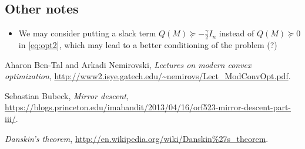 \documentclass{article}
\begin{document}
\subsection*{Other notes}

\begin{itemize}
\item We may consider putting a slack term $Q(M) \succeq -\frac{\gamma}{2} I_n$ instead of $Q(M) \succeq 0$ in \eqref{eq:opt2}, which may lead to a better conditioning of the problem (?)
\end{itemize}


 
\begin{thebibliography}{9}

  Aharon Ben-Tal and Arkadi Nemirovski,
  \emph{Lectures on modern convex optimization},
  \url{http://www2.isye.gatech.edu/~nemirovs/Lect_ModConvOpt.pdf}.
  
  Sebastian Bubeck,
  \emph{Mirror descent},
  \url{https://blogs.princeton.edu/imabandit/2013/04/16/orf523-mirror-descent-part-iii/}.  

  \emph{Danskin's theorem},
  \url{http://en.wikipedia.org/wiki/Danskin\%27s_theorem}.  

\end{thebibliography}
\end{document}
